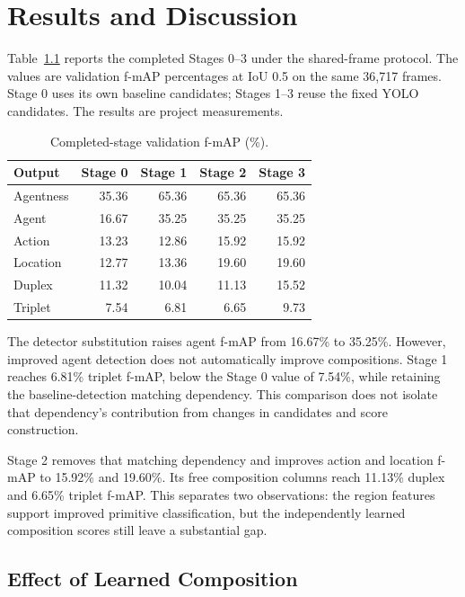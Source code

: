 \chapter{Results and Discussion}

Table~\ref{tab:3} reports the completed Stages 0--3 under the shared-frame protocol. The values are validation f-mAP percentages at IoU 0.5 on the same 36,717 frames. Stage 0 uses its own baseline candidates; Stages 1--3 reuse the fixed YOLO candidates. The results are project measurements.

\begin{table}[htbp]
\centering
\caption{Completed-stage validation f-mAP (\%).}
\label{tab:3}
\begin{singlespace}
\begin{tabular}{@{}lrrrr@{}}
\toprule
\textbf{Output} & \textbf{Stage 0} & \textbf{Stage 1} & \textbf{Stage 2} & \textbf{Stage 3} \\
\midrule
Agentness & 35.36 & 65.36 & 65.36 & 65.36 \\
Agent & 16.67 & 35.25 & 35.25 & 35.25 \\
Action & 13.23 & 12.86 & 15.92 & 15.92 \\
Location & 12.77 & 13.36 & 19.60 & 19.60 \\
Duplex & 11.32 & 10.04 & 11.13 & 15.52 \\
Triplet & 7.54 & 6.81 & 6.65 & 9.73 \\
\bottomrule
\end{tabular}
\end{singlespace}
\end{table}

The detector substitution raises agent f-mAP from 16.67\% to 35.25\%. However, improved agent detection does not automatically improve compositions. Stage 1 reaches 6.81\% triplet f-mAP, below the Stage 0 value of 7.54\%, while retaining the baseline-detection matching dependency. This comparison does not isolate that dependency’s contribution from changes in candidates and score construction.

Stage 2 removes that matching dependency and improves action and location f-mAP to 15.92\% and 19.60\%. Its free composition columns reach 11.13\% duplex and 6.65\% triplet f-mAP. This separates two observations: the region features support improved primitive classification, but the independently learned composition scores still leave a substantial gap.

\section{Effect of Learned Composition}

